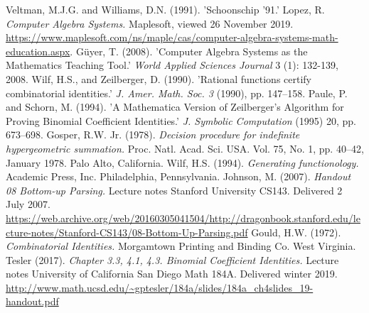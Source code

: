 Veltman, M.J.G. and Williams, D.N. (1991). 'Schoonschip ’91.'\label{Ref: veltman}
Lopez, R. \textit{Computer Algebra Systems.} Maplesoft, viewed 26 November 2019. \url{https://www.maplesoft.com/ns/maple/cas/computer-algebra-systems-math-education.aspx}.\label{Ref: maple}
Güyer, T. (2008). 'Computer Algebra Systems as the Mathematics Teaching Tool.' \textit{World Applied Sciences Journal} 3 (1): 132-139, 2008.\label{Ref: computeralgebra}
Wilf, H.S., and Zeilberger, D. (1990). 'Rational functions certify combinatorial identities.' \textit{J. Amer. Math. Soc. 3} (1990), pp. 147–158.\label{Ref: wz}
Paule, P. and Schorn, M. (1994). 'A Mathematica Version of Zeilberger's Algorithm for Proving Binomial Coefficient Identities.' \textit{J. Symbolic Computation} (1995) 20, pp. 673--698.\label{Ref: mathematica}
Gosper, R.W. Jr. (1978). \textit{Decision procedure for indefinite hypergeometric summation.} Proc. Natl. Acad. Sci. USA. Vol. 75, No. 1, pp. 40--42, January 1978. Palo Alto, California.\label{Ref: gosper}
Wilf, H.S. (1994). \textit{Generating functionology.} Academic Press, Inc. Philadelphia, Pennsylvania.\label{Ref: wilf}
Johnson, M. (2007). \textit{Handout 08 Bottom-up Parsing.} Lecture notes Stanford University CS143. Delivered 2 July 2007. \url{https://web.archive.org/web/20160305041504/http://dragonbook.stanford.edu/lecture-notes/Stanford-CS143/08-Bottom-Up-Parsing.pdf}\label{Ref: parser}
Gould, H.W. (1972). \textit{Combinatorial Identities.} Morgamtown Printing and Binding Co. West Virginia.\label{Ref: gould}
Tesler (2017). \textit{Chapter 3.3, 4.1, 4.3. Binomial Coefficient Identities.} Lecture notes University of California San Diego Math 184A. Delivered winter 2019. \url{http://www.math.ucsd.edu/~gptesler/184a/slides/184a_ch4slides_19-handout.pdf}\label{Ref: tesler}
